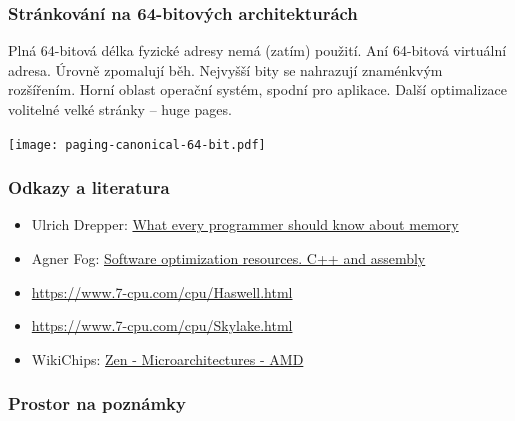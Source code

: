 \documentclass{beamer}
\begin{document}
\begin{frame}
\frametitle{Stránkování na 64-bitových architekturách}

Plná 64-bitová délka fyzické adresy nemá (zatím) použití.
Aní 64-bitová virtuální adresa. Úrovně zpomalují běh.
Nejvyšší bity se nahrazují znaménkvým rozšířením.
Horní oblast operační systém, spodní pro aplikace.
Další optimalizace volitelné velké stránky -- huge pages.

{
\centering

\texttt{[image: paging-canonical-64-bit.pdf]}

}
\end{frame}

\begin{frame}
\frametitle{Odkazy a literatura}

\begin{itemize}
\item Ulrich Drepper: \href{https://lwn.net/Articles/250967/}{What every programmer should know about memory}
\item Agner Fog: \href{https://www.agner.org/optimize/}{Software optimization resources. C++ and assembly}
\item \url{https://www.7-cpu.com/cpu/Haswell.html}
\item \url{https://www.7-cpu.com/cpu/Skylake.html}
\item WikiChips: \href{https://en.wikichip.org/wiki/amd/microarchitectures/zen}{Zen - Microarchitectures - AMD}

\end{itemize}

\end{frame}

\begin{frame}
\frametitle{Prostor na poznámky}

\end{frame}
\end{document}
